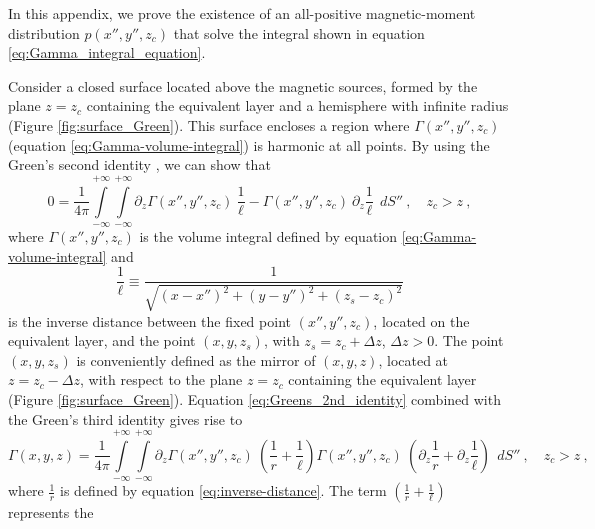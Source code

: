 \label{append:proof-positive-p}

In this appendix, we prove the existence of an all-positive magnetic-moment 
distribution $p(x'', y'', z_{c})$ that solve the integral shown in equation 
\ref{eq:Gamma_integral_equation}.

Consider a closed surface located above the magnetic sources, formed by the plane $z = z_{c}$ containing the equivalent layer and a hemisphere with infinite radius
(Figure \ref{fig:surface_Green}).
This surface encloses a region where $\Gamma(x'', y'', z_{c})$ 
(equation \ref{eq:Gamma-volume-integral}) is harmonic at all points.
By using the Green's second identity \citep[][ p. 215]{kellogg1967}, we can show that
\begin{equation}
0 = \frac{1}{4\pi}
\int\limits_{-\infty}^{+\infty}\int\limits_{-\infty}^{+\infty}
\partial_{z} \Gamma(x'', y'', z_{c}) \: \frac{1}{\ell} - 
\Gamma(x'', y'', z_{c}) \: \partial_{z} \frac{1}{\ell}
\:\: dS'' \: , \quad z_{c} > z \: ,
\label{eq:Greens_2nd_identity}
\end{equation}
where $\Gamma(x'', y'', z_{c})$ is the volume integral defined by equation 
\ref{eq:Gamma-volume-integral} and
\begin{equation}
\frac{1}{\ell} \equiv \frac{1}{\sqrt{(x - x'')^{2} +
		(y - y'')^{2} +
		(z_{s} - z_{c})^{2}}}
\label{eq:inv-l}
\end{equation}
is the inverse distance between the fixed point $(x'', y'', z_{c})$, located on the
equivalent layer, and the point $(x, y, z_{s})$, with $z_{s} = z_{c} + \Delta z$,
$\Delta z > 0$.
The point $(x, y, z_{s})$ is conveniently defined as the mirror of $(x, y, z)$,
located at $z = z_{c} - \Delta z$, with respect to the plane $z = z_{c}$ containing
the equivalent layer (Figure \ref{fig:surface_Green}).
Equation \ref{eq:Greens_2nd_identity} combined with the 
Green's third identity \citep[][ p. 219]{kellogg1967} gives rise to
\begin{equation}
\Gamma(x, y, z) = \frac{1}{4\pi}
\int\limits_{-\infty}^{+\infty}\int\limits_{-\infty}^{+\infty}
\partial_{z} \Gamma(x'', y'', z_{c}) \: 
\left( \frac{1}{r} + \frac{1}{\ell} \right)
\Gamma(x'', y'', z_{c}) \: 
\left( \partial_{z} \frac{1}{r} + \partial_{z} \frac{1}{\ell} \right)
\:\: dS'' \: , \quad z_{c} > z \: ,
\label{eq:Greens_3rd_identity}
\end{equation}
where $\frac{1}{r}$ is defined by equation \ref{eq:inverse-distance}.
The term $\left( \frac{1}{r} + \frac{1}{\ell} \right)$ represents the 
